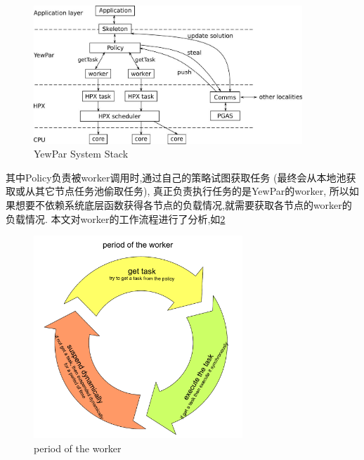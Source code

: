 \documentclass{mproj}
\begin{document}
\begin{figure}[h] %
    \centering %
    \includegraphics[width=0.9\textwidth]{images/YewPar_System_Stack.jpg} %
    \caption{YewPar System Stack} %
    \label{fig:yewpar_system_stack} %
\end{figure}
\FloatBarrier

其中Policy负责被worker调用时,通过自己的策略试图获取任务
(最终会从本地池获取或从其它节点任务池偷取任务),
真正负责执行任务的是YewPar的worker,
所以如果想要不依赖系统底层函数获得各节点的负载情况,就需要获取各节点的worker的负载情况.
本文对worker的工作流程进行了分析,如\cref{fig:period_of_worker}

\begin{figure}[h]
    \centering %
    \includegraphics[width=0.7\textwidth]{images/period_of_worker.pdf} %
    \caption{period of the worker} %
    \label{fig:period_of_worker} %
\end{figure}
\FloatBarrier
\end{document}
